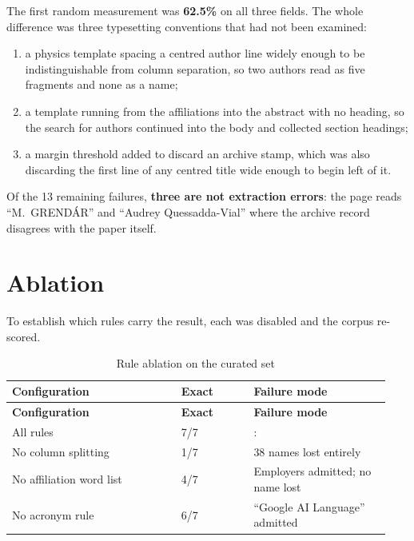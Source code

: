 \documentclass[12pt,a4paper]{report}
\begin{document}
The first random measurement was \textbf{62.5\%} on all three fields. The whole
difference was three typesetting conventions that had not been examined:

\begin{enumerate}[leftmargin=*]
  \item a physics template spacing a centred author line widely enough to be
        indistinguishable from column separation, so two authors read as five
        fragments and none as a name;
  \item a template running from the affiliations into the abstract with no
        heading, so the search for authors continued into the body and
        collected section headings;
  \item a margin threshold added to discard an archive stamp, which was also
        discarding the first line of any centred title wide enough to begin
        left of it.
\end{enumerate}

Of the 13 remaining failures, \textbf{three are not extraction errors}: the page
reads ``M.~GRENDÁR'' and ``Audrey Quessadda-Vial'' where the archive record
disagrees with the paper itself.

\section{Ablation}

To establish which rules carry the result, each was disabled and the corpus
re-scored.

\begin{longtable}{@{}p{0.42\linewidth}p{0.18\linewidth}p{0.34\linewidth}@{}}
\caption{Rule ablation on the curated set}\label{tab:ablation}\\
\toprule
\textbf{Configuration} & \textbf{Exact} & \textbf{Failure mode} \\
\midrule
\endfirsthead
\toprule
\textbf{Configuration} & \textbf{Exact} & \textbf{Failure mode} \\
\midrule
\endhead

All rules                       & 7/7 &: \\
No column splitting             & 1/7 & 38 names lost entirely \\
No affiliation word list        & 4/7 & Employers admitted; no name lost \\
No acronym rule                 & 6/7 & ``Google AI Language'' admitted \\
\bottomrule
\end{longtable}
\end{document}
